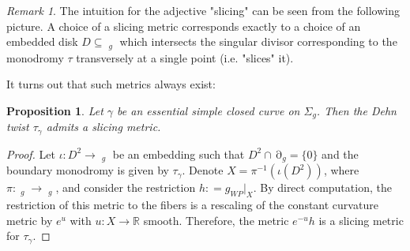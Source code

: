 \documentclass{article}
\DeclareMathOperator{\dm}{\overline{\mathcal{M}}}
\DeclareMathOperator{\scr}{\overline{\mathcal{C}}}
\DeclareMathOperator{\sdiv}{\partial \dm}
\theoremstyle{plain}
\newtheorem{prop}{Proposition}[section]
\theoremstyle{remark}
\newtheorem*{rem}{Remark}
\theoremstyle{definition}
\begin{document}
\begin{rem}
    The intuition for the adjective "slicing" can be seen from the following picture. A choice of a slicing metric corresponds exactly to a choice of an embedded disk $D \subseteq \dm_g$ which intersects the singular divisor corresponding to the monodromy $\tau$ transversely at a single point (i.e. "slices" it).
\end{rem}
It turns out that such metrics always exist\thinspace:
\begin{prop}
    Let $\gamma$ be an essential simple closed curve on $\Sigma_g$. Then the Dehn twist $\tau_\gamma$ admits a slicing metric.
\end{prop}
\begin{proof}
    Let $\iota : D^2 \to \dm_g$ be an embedding such that $D^2 \cap \sdiv_g = \{0\}$ and the boundary monodromy is given by $\tau_\gamma$. Denote $X = \pi^{-1}(\iota(D^2))$, where $\pi : \scr_g \to \dm_g$, and consider the restriction $h: = g_{WP}|_X$. By direct computation, the restriction of this metric to the fibers is a rescaling of the constant curvature metric by $e^u$ with $u: X\to \mathbb{R}$ smooth. Therefore, the metric $e^{-u}h$ is a slicing metric for $\tau_{\gamma}$.
\end{proof}
\end{document}
